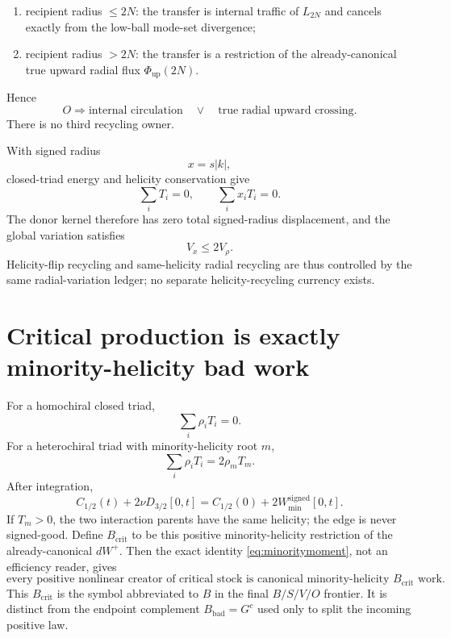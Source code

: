 \documentclass[11pt]{article}
\begin{document}
\begin{enumerate}[label=(\roman*)]
\item recipient radius $\le2N$: the transfer is internal traffic of $L_{2N}$ and cancels exactly from the low-ball mode-set divergence;
\item recipient radius $>2N$: the transfer is a restriction of the already-canonical true upward radial flux $\Phi_{\mathrm{up}}(2N)$.
\end{enumerate}
Hence
\begin{equation}\label{eq:Oquotient}
\boxed{
O\Longrightarrow
\text{internal circulation}
\quad\vee\quad
\text{true radial upward crossing}.
}
\end{equation}
There is no third recycling owner.

With signed radius
\[
x=s|k|,
\]
closed-triad energy and helicity conservation give
\begin{equation}\label{eq:signedradiuscons}
\sum_iT_i=0,
\qquad
\sum_ix_iT_i=0.
\end{equation}
The donor kernel therefore has zero total signed-radius displacement, and the global variation satisfies
\begin{equation}\label{eq:VxVrho}
\boxed{V_x\le2V_\rho.}
\end{equation}
Helicity-flip recycling and same-helicity radial recycling are thus controlled by the same radial-variation ledger; no separate helicity-recycling currency exists.

\section{Critical production is exactly minority-helicity bad work}

For a homochiral closed triad,
\[
\sum_i\rho_iT_i=0.
\]
For a heterochiral triad with minority-helicity root $m$,
\begin{equation}\label{eq:minoritymoment}
\boxed{
\sum_i\rho_iT_i=2\rho_mT_m.
}
\end{equation}
After integration,
\begin{equation}\label{eq:criticalminority}
\boxed{
C_{1/2}(t)+2\nu D_{3/2}[0,t]
=C_{1/2}(0)+2W_{\min}^{\mathrm{signed}}[0,t].
}
\end{equation}
If $T_m>0$, the two interaction parents have the same helicity; the edge is never signed-good.  Define $B_{\mathrm{crit}}$ to be this positive minority-helicity restriction of the already-canonical $dW^+$.  Then the exact identity \eqref{eq:minoritymoment}, not an efficiency reader, gives
\begin{equation}\label{eq:allpositivecriticalB}
\boxed{
\text{every positive nonlinear creator of critical stock is canonical minority-helicity }B_{\mathrm{crit}}\text{ work}.
}
\end{equation}
This $B_{\mathrm{crit}}$ is the symbol abbreviated to $B$ in the final $B/S/V/O$ frontier.  It is distinct from the endpoint complement $B_{\mathrm{bad}}=G^c$ used only to split the incoming positive law.
\end{document}

